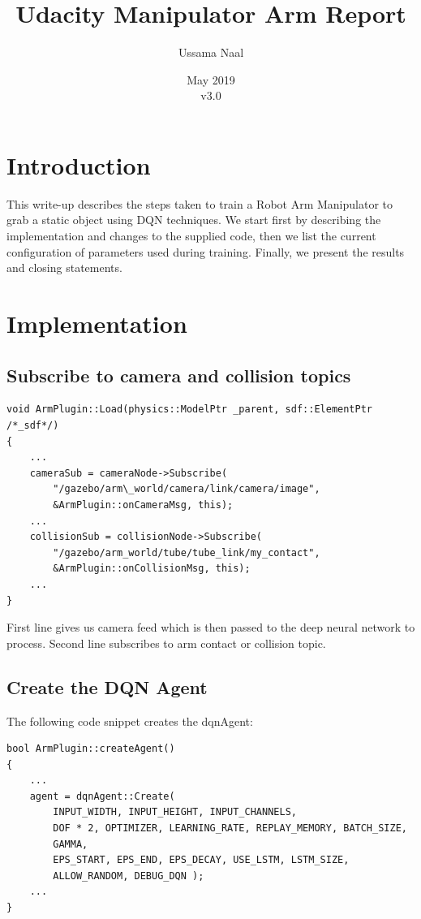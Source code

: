 \documentclass{article}
\title{Udacity Manipulator Arm Report}
\author{Ussama Naal}
\date{May 2019\\v3.0}
\begin{document}
\maketitle

\section{Introduction}

This write-up describes the steps taken to train a Robot Arm Manipulator to grab a static object using DQN techniques. We start first by describing the implementation and changes to the supplied code, then we list the current configuration of  parameters used during training. Finally, we present the results and closing statements.

\section{Implementation}

\subsection{Subscribe to camera and collision topics}

\begin{lstlisting}
void ArmPlugin::Load(physics::ModelPtr _parent, sdf::ElementPtr /*_sdf*/)
{
    ...
    cameraSub = cameraNode->Subscribe(
        "/gazebo/arm\_world/camera/link/camera/image",
        &ArmPlugin::onCameraMsg, this);
    ...
    collisionSub = collisionNode->Subscribe(
        "/gazebo/arm_world/tube/tube_link/my_contact",
        &ArmPlugin::onCollisionMsg, this);
    ...
}
\end{lstlisting}

First line gives us camera feed which is then passed to the deep neural network to process. Second line subscribes to arm contact or collision topic.



\subsection{Create the DQN Agent}

The following code snippet creates the dqnAgent:

\begin{lstlisting}
bool ArmPlugin::createAgent()
{
    ...
    agent = dqnAgent::Create(
        INPUT_WIDTH, INPUT_HEIGHT, INPUT_CHANNELS,
    	DOF * 2, OPTIMIZER, LEARNING_RATE, REPLAY_MEMORY, BATCH_SIZE,
    	GAMMA,
    	EPS_START, EPS_END, EPS_DECAY, USE_LSTM, LSTM_SIZE,
    	ALLOW_RANDOM, DEBUG_DQN );
    ...
}
\end{lstlisting}
\end{document}
